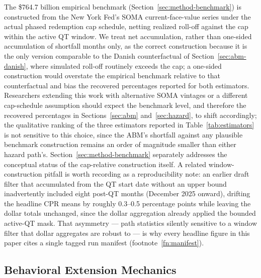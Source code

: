 \documentclass[12pt]{article}
\begin{document}
The \$764.7 billion empirical benchmark (Section~\ref{sec:method-benchmark}) is constructed from the New York Fed's SOMA current-face-value series under the actual phased redemption cap schedule, netting realized roll-off against the cap within the active QT window. We treat net accumulation, rather than one-sided accumulation of shortfall months only, as the correct construction because it is the only version comparable to the Danish counterfactual of Section~\ref{sec:abm-danish}, where simulated roll-off routinely exceeds the cap; a one-sided construction would overstate the empirical benchmark relative to that counterfactual and bias the recovered percentages reported for both estimators. Researchers extending this work with alternative SOMA vintages or a different cap-schedule assumption should expect the benchmark level, and therefore the recovered percentages in Sections~\ref{sec:abm} and~\ref{sec:hazard}, to shift accordingly; the qualitative ranking of the three estimators reported in Table~\ref{tab:estimators} is not sensitive to this choice, since the ABM's shortfall against any plausible benchmark construction remains an order of magnitude smaller than either hazard path's. Section~\ref{sec:method-benchmark} separately addresses the conceptual status of the cap-relative construction itself. A related window-construction pitfall is worth recording as a reproducibility note: an earlier draft filter that accumulated from the QT start date without an upper bound inadvertently included eight post-QT months (December 2025 onward), drifting the headline CPR means by roughly 0.3--0.5 percentage points while leaving the dollar totals unchanged, since the dollar aggregation already applied the bounded active-QT mask. That asymmetry --- path statistics silently sensitive to a window filter that dollar aggregates are robust to --- is why every headline figure in this paper cites a single tagged run manifest (footnote~\ref{fn:manifest}).

\subsection{Behavioral Extension Mechanics}\label{sec:robustness-extensions}
\end{document}
